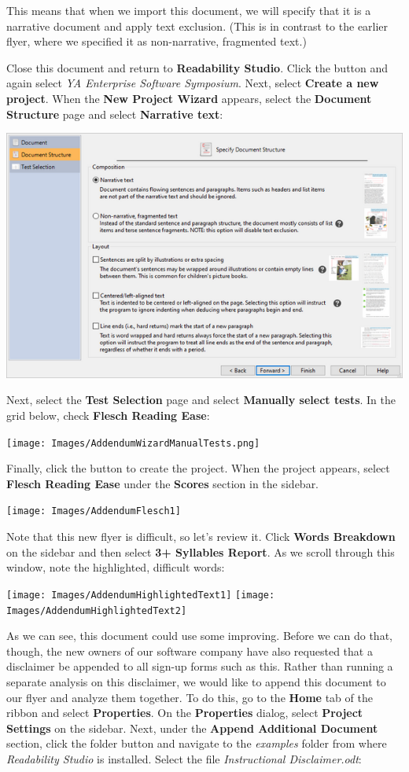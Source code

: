 \documentclass[
]{book}
\theoremstyle{definition}
\theoremstyle{definition}
\theoremstyle{definition}
\theoremstyle{definition}
\theoremstyle{remark}
\begin{document}
This means that when we import this document, we will specify that it is a narrative document and apply text exclusion. (This is in contrast to the earlier flyer, where we specified it as non-narrative, fragmented text.)

Close this document and return to \textbf{Readability Studio}. Click the  button and again select \emph{YA Enterprise Software Symposium}. Next, select \textbf{Create a new project}. When the \textbf{New Project Wizard} appears, select the \textbf{Document Structure} page and select \textbf{Narrative text}:

\includegraphics{Images/wizarddocstructure.png}

Next, select the \textbf{Test Selection} page and select \textbf{Manually select tests}. In the grid below, check \textbf{Flesch Reading Ease}:

\texttt{[image: Images/AddendumWizardManualTests.png]}

Finally, click the  button to create the project. When the project appears, select \textbf{Flesch Reading Ease} under the \textbf{Scores} section in the sidebar.

\begin{center}\texttt{[image: Images/AddendumFlesch1]} \end{center}

Note that this new flyer is difficult, so let's review it. Click \textbf{Words Breakdown} on the sidebar and then select \textbf{3+ Syllables Report}. As we scroll through this window, note the highlighted, difficult words:

\texttt{[image: Images/AddendumHighlightedText1]} \texttt{[image: Images/AddendumHighlightedText2]}

As we can see, this document could use some improving. Before we can do that, though, the new owners of our software company have also requested that a disclaimer be appended to all sign-up forms such as this. Rather than running a separate analysis on this disclaimer, we would like to append this document to our flyer and analyze them together. To do this, go to the \textbf{Home} tab of the ribbon and select \textbf{Properties}. On the \textbf{Properties} dialog, select \textbf{Project Settings} on the sidebar. Next, under the \textbf{Append Additional Document} section, click the folder button and navigate to the \emph{examples} folder from where \emph{Readability Studio} is installed. Select the file \emph{Instructional Disclaimer.odt}:
\end{document}
